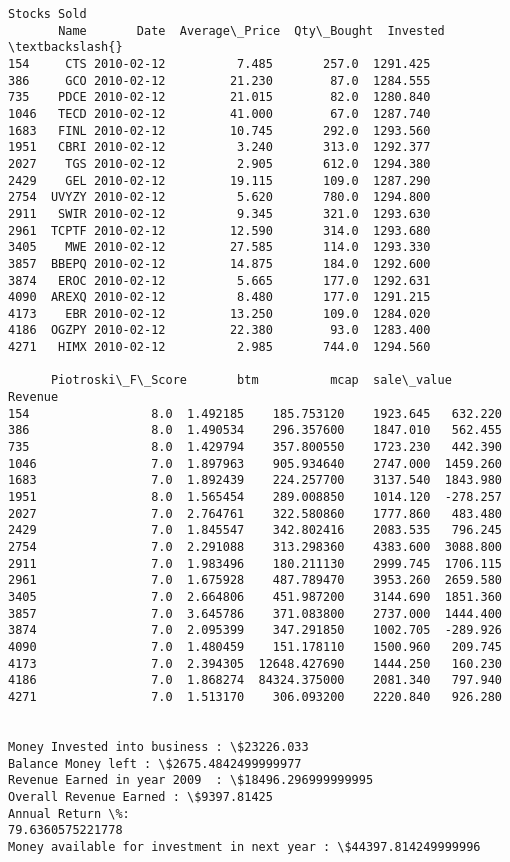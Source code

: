 \documentclass[11pt]{article}
\begin{document}
\begin{Verbatim}[commandchars=\\\{\}]
Stocks Sold
       Name       Date  Average\_Price  Qty\_Bought  Invested  \textbackslash{}
154     CTS 2010-02-12          7.485       257.0  1291.425
386     GCO 2010-02-12         21.230        87.0  1284.555
735    PDCE 2010-02-12         21.015        82.0  1280.840
1046   TECD 2010-02-12         41.000        67.0  1287.740
1683   FINL 2010-02-12         10.745       292.0  1293.560
1951   CBRI 2010-02-12          3.240       313.0  1292.377
2027    TGS 2010-02-12          2.905       612.0  1294.380
2429    GEL 2010-02-12         19.115       109.0  1287.290
2754  UVYZY 2010-02-12          5.620       780.0  1294.800
2911   SWIR 2010-02-12          9.345       321.0  1293.630
2961  TCPTF 2010-02-12         12.590       314.0  1293.680
3405    MWE 2010-02-12         27.585       114.0  1293.330
3857  BBEPQ 2010-02-12         14.875       184.0  1292.600
3874   EROC 2010-02-12          5.665       177.0  1292.631
4090  AREXQ 2010-02-12          8.480       177.0  1291.215
4173    EBR 2010-02-12         13.250       109.0  1284.020
4186  OGZPY 2010-02-12         22.380        93.0  1283.400
4271   HIMX 2010-02-12          2.985       744.0  1294.560

      Piotroski\_F\_Score       btm          mcap  sale\_value   Revenue
154                 8.0  1.492185    185.753120    1923.645   632.220
386                 8.0  1.490534    296.357600    1847.010   562.455
735                 8.0  1.429794    357.800550    1723.230   442.390
1046                7.0  1.897963    905.934640    2747.000  1459.260
1683                7.0  1.892439    224.257700    3137.540  1843.980
1951                8.0  1.565454    289.008850    1014.120  -278.257
2027                7.0  2.764761    322.580860    1777.860   483.480
2429                7.0  1.845547    342.802416    2083.535   796.245
2754                7.0  2.291088    313.298360    4383.600  3088.800
2911                7.0  1.983496    180.211130    2999.745  1706.115
2961                7.0  1.675928    487.789470    3953.260  2659.580
3405                7.0  2.664806    451.987200    3144.690  1851.360
3857                7.0  3.645786    371.083800    2737.000  1444.400
3874                7.0  2.095399    347.291850    1002.705  -289.926
4090                7.0  1.480459    151.178110    1500.960   209.745
4173                7.0  2.394305  12648.427690    1444.250   160.230
4186                7.0  1.868274  84324.375000    2081.340   797.940
4271                7.0  1.513170    306.093200    2220.840   926.280


Money Invested into business : \$23226.033
Balance Money left : \$2675.4842499999977
Revenue Earned in year 2009  : \$18496.296999999995
Overall Revenue Earned : \$9397.81425
Annual Return \%:
79.6360575221778
Money available for investment in next year : \$44397.814249999996



\end{Verbatim}
\end{document}
